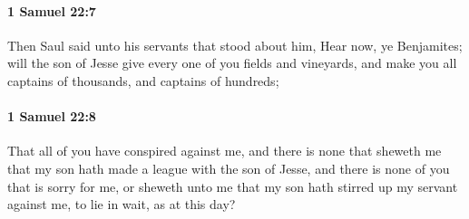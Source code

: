 		\paragraph{1 Samuel 22:7} %
			\label{1SAMUEL-22-7}

			Then Saul said unto his servants that stood about him, Hear now, ye Benjamites; will the son of Jesse give every one of you fields and vineyards, and make you all captains of thousands, and captains of hundreds;


		\paragraph{1 Samuel 22:8} %
			\label{1SAMUEL-22-8}

			That all of you have conspired against me, and there is none that sheweth me that my son hath made a league with the son of Jesse, and there is none of you that is sorry for me, or sheweth unto me that my son hath stirred up my servant against me, to lie in wait, as at this day?

